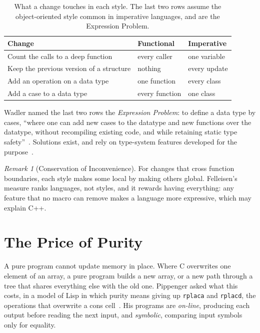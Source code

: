 \documentclass[11pt]{article}
\let\oldsection\section
\renewcommand{\section}{\Needspace{0.25\textheight}\oldsection}
\theoremstyle{definition}
\theoremstyle{remark}
\newtheorem{remark}[theorem]{Remark}
\newcommand{\code}[1]{\texttt{\upshape #1}}
\begin{document}
\begin{table}[ht]
  \centering
  \begin{tabular}{@{}lll@{}}
    \toprule
    Change & Functional & Imperative \\
    \midrule
    Count the calls to a deep function & every caller & one variable \\
    Keep the previous version of a structure & nothing & every update \\
    Add an operation on a data type & one function & every class \\
    Add a case to a data type & every function & one class \\
    \bottomrule
  \end{tabular}
  \caption{What a change touches in each style. The last two rows assume
    the object-oriented style common in imperative languages, and are the
  Expression Problem.}\label{tab:changes}
\end{table}

Wadler named the last two rows the \emph{Expression Problem}: to define
a data type by cases, ``where one can add new cases to the datatype and
new functions over the datatype, without recompiling existing code, and
while retaining static type safety''~\cite{expression}. Solutions exist,
and rely on type-system features developed for the
purpose~\cite{swierstra}.

\begin{remark}[Conservation of Inconvenience]
  For changes that cross function boundaries, each style makes some local
  by making others global. Felleisen's measure ranks languages, not
  styles, and it rewards having everything: any feature that no macro can
  remove makes a language more expressive, which may explain C++.
\end{remark}

\section{The Price of Purity}\label{sec:cost}

A pure program cannot update memory in place. Where C overwrites one
element of an array, a pure program builds a new array, or a new path
through a tree that shares everything else with the old one. Pippenger
asked what this costs, in a model of Lisp in which purity means giving
up \code{rplaca} and \code{rplacd}, the operations that overwrite a cons
cell~\cite{pippenger}. His programs are \emph{on-line}, producing each
output before reading the next input, and \emph{symbolic}, comparing
input symbols only for equality.
\end{document}

